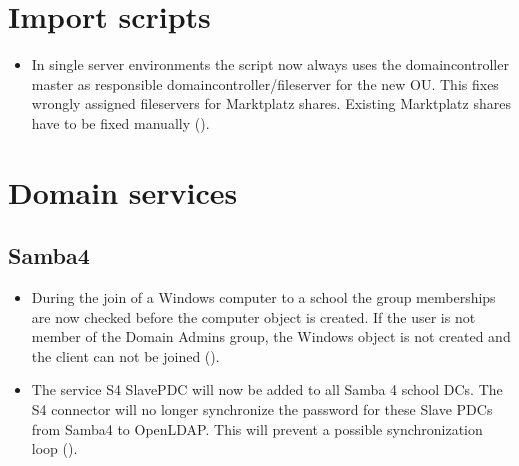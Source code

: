 

\section{Import scripts}
\begin{itemize}
\item In single server environments the script  now always uses the domaincontroller
  master as responsible domaincontroller/fileserver for the new OU. This fixes wrongly assigned fileservers
  for Marktplatz shares. Existing Marktplatz shares have to be fixed manually ().
\end{itemize}
 

\section{Domain services}

\subsection{Samba4}
\begin{itemize}
\item During the join of a Windows computer to a school the group memberships are now
 checked before the computer object is created. If the user is not member of the Domain Admins
 group, the Windows object is not created and the client can not be joined ().

\item The service S4 SlavePDC will now be added to all Samba 4 school DCs. The S4 connector will
 no longer synchronize the password for these Slave PDCs from Samba4 to OpenLDAP. This will prevent
 a possible synchronization loop ().
\end{itemize}


